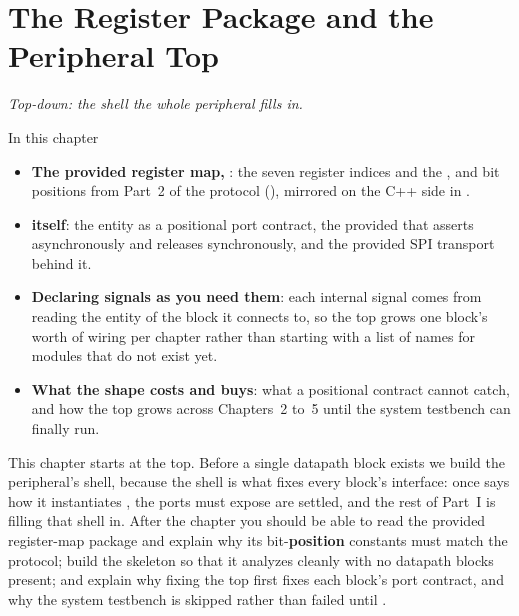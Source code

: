
\chapter{The Register Package and the Peripheral Top}
\label{c1:ch}

{\large\itshape Top-down: the shell the whole peripheral fills in.\par}

\begin{chapterbox}{In this chapter}
\begin{itemize}
  \item \textbf{The provided register map, }: the seven register indices and the
    ,  and  bit positions from Part~2 of the protocol
    (), mirrored on the C++ side in .
  \item \textbf{ itself}: the entity as a positional port contract, the provided
     that asserts asynchronously and releases synchronously, and the provided SPI
    transport behind it.
  \item \textbf{Declaring signals as you need them}: each internal signal comes from reading the
    entity of the block it connects to, so the top grows one block's worth of wiring per chapter
    rather than starting with a list of names for modules that do not exist yet.
  \item \textbf{What the shape costs and buys}: what a positional contract cannot catch, and how the
    top grows across Chapters~2 to~5 until the system testbench can finally run.
\end{itemize}
\end{chapterbox}

This chapter starts at the top. Before a single datapath block exists we build the peripheral's
shell, because the shell is what fixes every block's interface: once  says how it
instantiates , the ports  must expose are settled, and the rest of
Part~I is filling that shell in. After the chapter you should be able to read the provided
register-map package and explain why its bit-\textbf{position} constants must match the protocol;
build the  skeleton so that it analyzes cleanly with no datapath blocks present; and
explain why fixing the top first fixes each block's port contract, and why the system testbench is
skipped rather than failed until .

